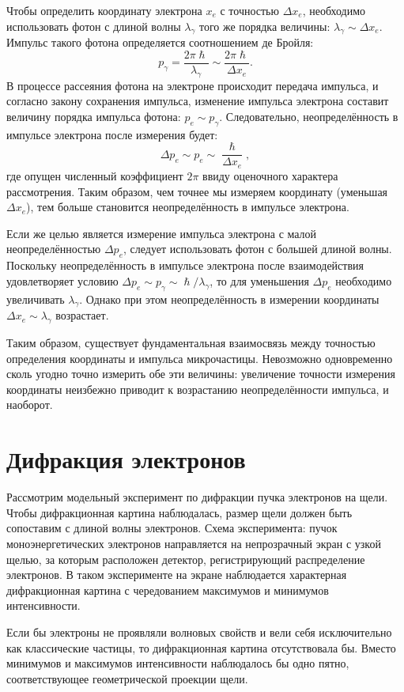 \documentclass[a4paper, 12pt]{article}
\begin{document}
Чтобы определить координату электрона $x_e$ с точностью $\Delta x_e$, необходимо использовать фотон с длиной волны $\lambda_{\gamma}$ того же порядка величины: $\lambda_{\gamma} \sim \Delta x_e$. Импульс такого фотона определяется соотношением де Бройля:
\[
p_{\gamma} = \frac{2\pi\hslash}{\lambda_{\gamma}} \sim \frac{2\pi\hslash}{\Delta x_e}.
\]
В процессе рассеяния фотона на электроне происходит передача импульса, и согласно закону сохранения импульса, изменение импульса электрона составит величину порядка импульса фотона: $p_e \sim p_{\gamma}$. Следовательно, неопределённость в импульсе электрона после измерения будет:
\[
\Delta p_e \sim p_e \sim \frac{\hslash}{\Delta x_e},
\]
где опущен численный коэффициент $2\pi$ ввиду оценочного характера рассмотрения. Таким образом, чем точнее мы измеряем координату (уменьшая $\Delta x_e$), тем больше становится неопределённость в импульсе электрона.

Если же целью является измерение импульса электрона с малой неопределённостью $\Delta p_e$, следует использовать фотон с большей длиной волны. Поскольку неопределённость в импульсе электрона после взаимодействия удовлетворяет условию $\Delta p_e \sim p_{\gamma} \sim \hslash / \lambda_{\gamma}$, то для уменьшения $\Delta p_e$ необходимо увеличивать $\lambda_{\gamma}$. Однако при этом неопределённость в измерении координаты $\Delta x_e \sim \lambda_{\gamma}$ возрастает. 

Таким образом, существует фундаментальная взаимосвязь между точностью определения координаты и импульса микрочастицы. Невозможно одновременно сколь угодно точно измерить обе эти величины: увеличение точности измерения координаты неизбежно приводит к возрастанию неопределённости импульса, и наоборот.

\section{Дифракция электронов}
Рассмотрим модельный эксперимент по дифракции пучка электронов на щели. Чтобы
дифракционная картина наблюдалась, размер щели должен быть сопоставим с длиной
волны электронов. Схема эксперимента: пучок моноэнергетических электронов
направляется на непрозрачный экран с узкой щелью, за которым расположен
детектор, регистрирующий распределение электронов. В таком эксперименте на
экране наблюдается характерная дифракционная картина с чередованием максимумов и
минимумов интенсивности.

Если бы электроны не проявляли волновых свойств и вели себя исключительно как
классические частицы, то дифракционная картина отсутствовала бы. Вместо
минимумов и максимумов интенсивности наблюдалось бы одно пятно, соответствующее
геометрической проекции щели.
\end{document}
